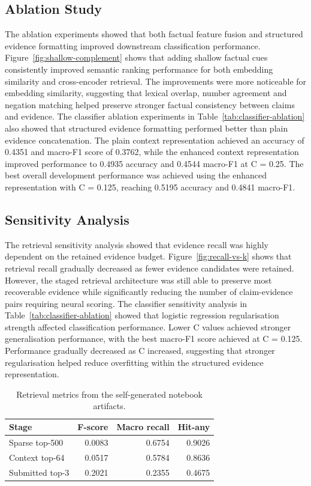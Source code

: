 \documentclass[11pt]{article}
\begin{document}
\subsection{Ablation Study}

The ablation experiments showed that both factual feature fusion and structured
evidence formatting improved downstream classification performance.
Figure~\ref{fig:shallow-complement} shows that adding shallow factual cues
consistently improved semantic ranking performance for both embedding
similarity and cross-encoder retrieval. The improvements were more noticeable
for embedding similarity, suggesting that lexical overlap, number agreement and
negation matching helped preserve stronger factual consistency between claims
and evidence. The classifier ablation experiments in
Table~\ref{tab:classifier-ablation} also showed that structured evidence
formatting performed better than plain evidence concatenation. The plain
context representation achieved an accuracy of 0.4351 and macro-F1 score of
0.3762, while the enhanced context representation improved performance to
0.4935 accuracy and 0.4544 macro-F1 at C = 0.25. The best overall development
performance was achieved using the enhanced representation with C = 0.125,
reaching 0.5195 accuracy and 0.4841 macro-F1.

\subsection{Sensitivity Analysis}

The retrieval sensitivity analysis showed that evidence recall was highly
dependent on the retained evidence budget. Figure~\ref{fig:recall-vs-k} shows
that retrieval recall gradually decreased as fewer evidence candidates were
retained. However, the staged retrieval architecture was still able to preserve
most recoverable evidence while significantly reducing the number of
claim-evidence pairs requiring neural scoring. The classifier sensitivity
analysis in Table~\ref{tab:classifier-ablation} showed that logistic regression
regularisation strength affected classification performance. Lower C values
achieved stronger generalisation performance, with the best macro-F1 score
achieved at C = 0.125. Performance gradually decreased as C increased,
suggesting that stronger regularisation helped reduce overfitting within the
structured evidence representation.


\begin{table}[t]
\centering
\small
\begin{tabular}{lrrr}
\toprule
Stage & F-score & Macro recall & Hit-any \\
\midrule
Sparse top-500 & 0.0083 & 0.6754 & 0.9026 \\
Context top-64 & 0.0517 & 0.5784 & 0.8636 \\
Submitted top-3 & 0.2021 & 0.2355 & 0.4675 \\
\bottomrule
\end{tabular}
\caption{Retrieval metrics from the self-generated notebook artifacts.}
\label{tab:retrieval}
\end{table}
\end{document}
